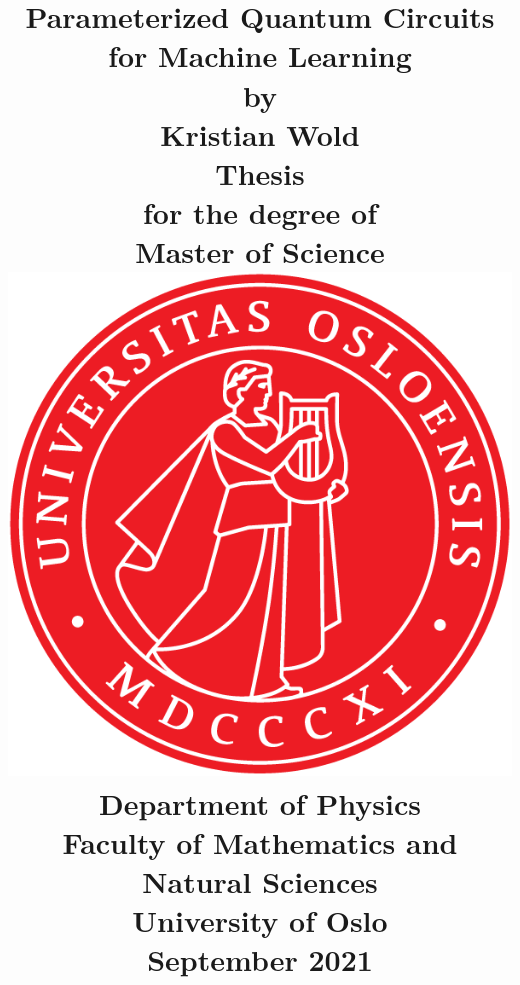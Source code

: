 \title{
    \Large \textbf{Parameterized Quantum Circuits for Machine Learning}
    \\[8 pt]
    \large by
    \\ [8 pt]
    \large Kristian Wold
    \\ [40 pt]
    \large \textbf{Thesis}
    \\ [8 pt]
    \large for the degree of
    \\ [8 pt]
    \large \textbf{Master of Science}
    \\ [30 pt]
    \includegraphics[scale=0.9]{latex/latex-report/3_Images/Logo/UiO/UiO_Segl_300dpi.png}
    \\ [30 pt]
    \large Department of Physics
    \\ [8 pt]
    \large Faculty of Mathematics and Natural Sciences
    \\ [8 pt]
    \large University of Oslo
    \\ [15 pt]
    \large September 2021
}%

\author{\vspace{-5ex}}
\date{\vspace{-5ex}}


\maketitle